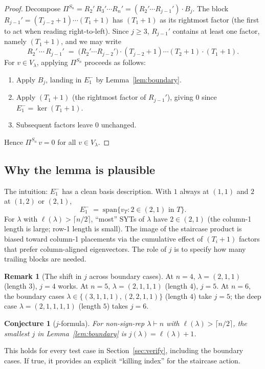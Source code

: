 \documentclass[11pt]{article}
\newtheorem{conjecture}[theorem]{Conjecture}
\theoremstyle{definition}
\newtheorem{remark}[theorem]{Remark}
\begin{document}
\begin{proof}
Decompose $\Pi^{S_n} = R_2'\,R_3'\cdots R_n' = (R_2'\cdots R_{j-1}')\cdot B_j$.
The block $R_{j-1}' = (T_{j-2}{+}1)\cdots(T_1{+}1)$ has
$(T_1{+}1)$ as its rightmost factor (the first to act when reading
right-to-left). Since $j\ge 3$, $R_{j-1}'$ contains at least one
factor, namely $(T_1{+}1)$, and we may write
\[
  R_2'\,\cdots\,R_{j-1}' \;=\; \bigl(R_2'\cdots R_{j-2}'\bigr)
                              \cdot(T_{j-2}{+}1)\cdots(T_2{+}1)\cdot(T_1{+}1).
\]
For $v\in V_\lambda$, applying $\Pi^{S_n}$ proceeds as follows:
\begin{enumerate}[topsep=0.3em,itemsep=0.2em,leftmargin=2em]
\item Apply $B_j$, landing in $E_1^-$ by Lemma~\ref{lem:boundary}.
\item Apply $(T_1{+}1)$ (the rightmost factor of $R_{j-1}'$), giving $0$
since $E_1^-=\ker(T_1{+}1)$.
\item Subsequent factors leave $0$ unchanged.
\end{enumerate}
Hence $\Pi^{S_n}\,v=0$ for all $v\in V_\lambda$.
\end{proof}

\subsection{Why the lemma is plausible}

The intuition: $E_1^-$ has a clean basis description. With $1$ always
at $(1,1)$ and $2$ at $(1,2)$ or $(2,1)$,
\[
   E_1^- \;=\; \mathrm{span}\bigl\{v_T : 2 \in (2,1) \text{ in } T\bigr\}.
\]
For $\lambda$ with $\ell(\lambda)>\lceil n/2\rceil$, ``most'' SYTs
of $\lambda$ have $2\in(2,1)$ (the column-1 length is large; row-1
length is small). The image of the staircase product is biased
toward column-1 placements via the cumulative effect of $(T_i{+}1)$
factors that prefer column-aligned eigenvectors. The role of $j$
is to specify how many trailing blocks are needed.

\begin{remark}[The shift in $j$ across boundary cases]
At $n=4$, $\lambda=(2,1,1)$ (length $3$), $j=4$ works. At $n=5$,
$\lambda=(2,1,1,1)$ (length $4$), $j=5$. At $n=6$, the boundary
cases $\lambda\in\{(3,1,1,1),(2,2,1,1)\}$ (length $4$) take $j=5$;
the deep case $\lambda=(2,1,1,1,1)$ (length $5$) takes $j=6$.
\end{remark}

\begin{conjecture}[$j$-formula]\label{conj:j-formula}
For non-sign-rep $\lambda\vdash n$ with $\ell(\lambda)>\lceil n/2\rceil$,
the smallest $j$ in Lemma~\ref{lem:boundary} is
$j(\lambda)=\ell(\lambda)+1$.
\end{conjecture}
This holds for every test case in
Section~\ref{sec:verify}, including the boundary cases. If true,
it provides an explicit ``killing index'' for the staircase action.
\end{document}
